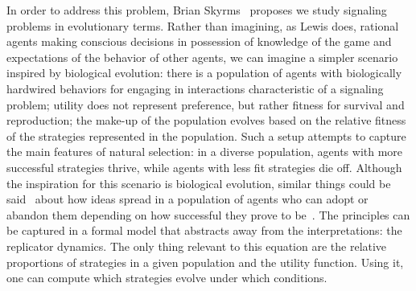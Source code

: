 \documentclass[a4paper]{article}
\begin{document}
In order to address this problem, Brian Skyrms~\parencite*{skyrms_evolution_1996} proposes we study signaling problems in evolutionary terms.
Rather than imagining, as Lewis does, rational agents making conscious decisions in possession of knowledge of the game and expectations of the behavior of other agents, we can imagine a simpler scenario inspired by biological evolution: there is a population of agents with biologically hardwired behaviors for engaging in interactions characteristic of a signaling problem; utility does not represent preference, but rather fitness for survival and reproduction; the make-up of the population evolves based on the relative fitness of the strategies represented in the population.
Such a setup attempts to capture the main features of natural selection: in a diverse population, agents with more successful strategies thrive, while agents with less fit strategies die off.
Although the inspiration for this scenario is biological evolution, similar things could be said~\parencite[\emph{e.g.}][]{dawkins_selfish_1978,boyd_culture_1985} about how ideas spread in a population of agents who can adopt or abandon them depending on how successful they prove to be~\parencite[\emph{e.g.}][]{BenzJager2006:Game-Theory-and,Pagel2009:Human-Language-,ThompsonKirby2016:Culture-Shapes-}.
The principles can be captured in a formal model that abstracts away from the interpretations: the replicator dynamics.
The only thing relevant to this equation are the relative proportions of strategies in a given population and the utility function.
Using it, one can compute which strategies evolve under which conditions.
\end{document}
